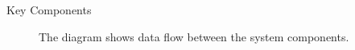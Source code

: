 \documentclass[12pt]{beamer}
\begin{document}
\begin{frame}[allowframebreaks]{Key Components}
\begin{figure}
    \centering
    \caption{The diagram shows data flow between the system components.}
    \label{fig:1-1}
\end{figure}
\end{frame}
\end{document}

